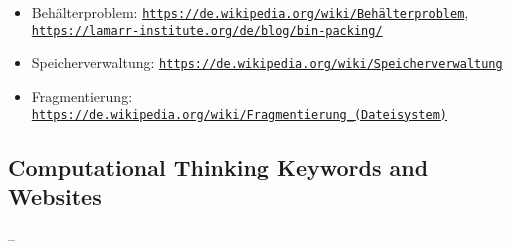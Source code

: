 \documentclass[a4paper,11pt]{report}
\newcommand{\BrochureUrlText}[1]{\texttt{#1}}
\begin{document}
\begin{itemize}
  \item Behälterproblem: \href{https://de.wikipedia.org/wiki/Beh\%C3\%A4lterproblem}{\BrochureUrlText{https://de.wikipedia.org/wiki/Behälterproblem}}, \href{https://lamarr-institute.org/de/blog/bin-packing/}{\BrochureUrlText{https://lamarr-institute.org/de/blog/bin-packing/}}
  \item Speicherverwaltung: \href{https://de.wikipedia.org/wiki/Speicherverwaltung}{\BrochureUrlText{https://de.wikipedia.org/wiki/Speicherverwaltung}}
  \item Fragmentierung: \href{https://de.wikipedia.org/wiki/Fragmentierung_(Dateisystem)}{\BrochureUrlText{https://de.wikipedia.org/wiki/Fragmentierung\_(Dateisystem)}}
\end{itemize}


\subsection*{Computational Thinking Keywords and Websites}

–
\end{document}

